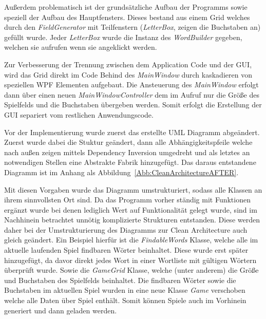 Außerdem problematisch ist der grundsätzliche Aufbau der Programms sowie speziell der Aufbau des Hauptfensters. Dieses bestand aus einem Grid welches durch den \textit{FieldGenerator} mit Teilfenstern (\textit{LetterBox}, zeigen die Buchstaben an) gefüllt wurde. Jeder \textit{LetterBox} wurde die Instanz des \textit{WordBuilder} gegeben, welchen sie aufrufen wenn sie angeklickt werden.


Zur Verbesserung der Trennung zwischen dem Application Code und der GUI, wird das Grid direkt im Code Behind des \textit{MainWindow} durch kaskadieren von speziellen WPF  Elementen aufgebaut. Die Ansteuerung des \textit{MainWindow} erfolgt dann über einen neuen \textit{MainWindowController} dem im Aufruf nur die Größe des Spielfelds und die Buchstaben übergeben werden. Somit erfolgt die Erstellung der GUI separiert vom restlichen Anwendungscode.





Vor der Implementierung wurde zuerst das erstellte UML Diagramm abgeändert. Zuerst wurde dabei die Stuktur geändert, dann alle Abhängigkeitspfeile welche nach außen zeigen mittels Dependency Inversion umgedreht und als letztes an notwendigen Stellen eine Abstrakte Fabrik hinzugefügt. Das daraus entstandene Diagramm ist im Anhang als Abbildung~\ref{Abb:CleanArchitectureAFTER}.


Mit diesen Vorgaben wurde das Diagramm umstrukturiert, sodass alle Klassen an ihrem sinnvollsten Ort sind. Da das Programm vorher ständig mit Funktionen ergänzt wurde bei denen lediglich Wert auf Funktionalität gelegt wurde, sind im Nachhinein betrachtet unnötig komplizierte Strukturen entstanden. Diese werden daher bei der Umstrukturierung des Diagramms zur Clean Architecture auch gleich geändert. 
Ein Beispiel hierfür ist die \textit{FindableWords} Klasse, welche alle im aktuelle laufenden Spiel findbaren Wörter beinhaltet. Diese wurde erst später hinzugefügt, da davor direkt jedes Wort in einer Wortliste mit gültigen Wörtern überprüft wurde. Sowie die \textit{GameGrid} Klasse, welche (unter anderem) die Größe und Buchstaben des Spielfelds beinhaltet. Die findbaren Wörter sowie die Buchstaben im aktuellen Spiel wurden in eine neue Klasse \textit{Game} verschoben welche alle Daten über Spiel enthält. Somit können Spiele auch im Vorhinein generiert und dann geladen werden.



